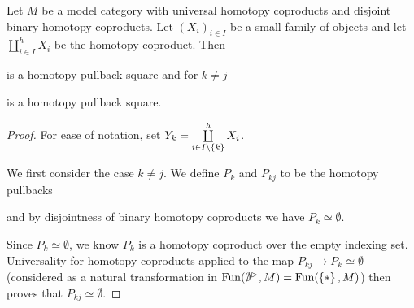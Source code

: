 \begin{corollary}\label{cor:genCoproductComponentPb}
    Let $M$ be a model category with universal homotopy coproducts and disjoint binary homotopy coproducts.
    Let $\left(X_i\right)_{i\in I}$ be a small family of objects and let $\coprod\limits_{i\in I}^h X_i$ be the homotopy coproduct.
    Then
    \begin{center}
    \end{center}
    is a homotopy pullback square and for $k\neq j$
    \begin{center}
    \end{center}
    is a homotopy pullback square.
    \begin{proof}
        For ease of notation, set $Y_k=\coprod\limits_{i\in I\setminus{\left\lbrace k\right\rbrace}}^hX_i$.

        We first consider the case $k\neq j$.
        We define $P_k$ and $P_{kj}$ to be the homotopy pullbacks 
        \begin{center}
        \end{center}
        and by disjointness of binary homotopy coproducts we have $P_k\simeq\emptyset$.

        Since $P_k\simeq\emptyset$, we know $P_k$ is a homotopy coproduct over the empty indexing set. 
        Universality for homotopy coproducts applied to the map $P_{kj}\to P_k\simeq\emptyset$ (considered as a natural transformation in $\operatorname{Fun}(\emptyset^{\rhd},M)=\operatorname{Fun}(\left\lbrace*\right\rbrace,M)$) then proves that $P_{kj}\simeq\emptyset$.


\end{proof}
\end{corollary}
